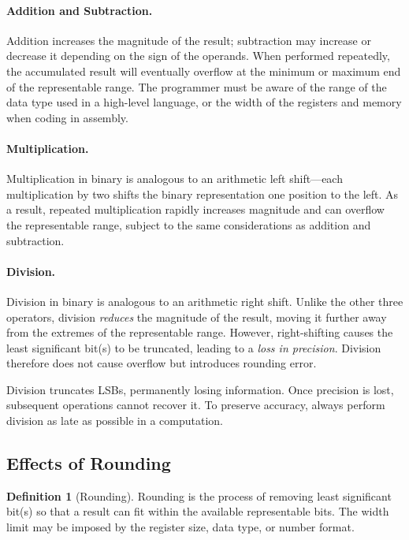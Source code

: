 \documentclass[11pt, a4paper, notitlepage]{report}
\theoremstyle{definition}
\newtheorem{definition}[theorem]{Definition}
\theoremstyle{remark}
\theoremstyle{definition}
\begin{document}
\paragraph{Addition and Subtraction.}
Addition increases the magnitude of the result; subtraction may increase or decrease it depending on the sign of the operands. When performed repeatedly, the accumulated result will eventually overflow at the minimum or maximum end of the representable range. The programmer must be aware of the range of the data type used in a high-level language, or the width of the registers and memory when coding in assembly.

\paragraph{Multiplication.}
Multiplication in binary is analogous to an arithmetic left shift---each multiplication by two shifts the binary representation one position to the left. As a result, repeated multiplication rapidly increases magnitude and can overflow the representable range, subject to the same considerations as addition and subtraction.

\paragraph{Division.}
Division in binary is analogous to an arithmetic right shift. Unlike the other three operators, division \emph{reduces} the magnitude of the result, moving it further away from the extremes of the representable range. However, right-shifting causes the least significant bit(s) to be truncated, leading to a \emph{loss in precision}. Division therefore does not cause overflow but introduces rounding error.

\begin{warning}[title={Warning: Division Destroys Precision}]
  Division truncates LSBs, permanently losing information. Once precision is lost, subsequent operations cannot recover it. To preserve accuracy, always perform division as late as possible in a computation.
\end{warning}

\subsection{Effects of Rounding}
\label{sec:rounding-effects}

\begin{definition}[Rounding]
  \label{def:rounding}
  Rounding is the process of removing least significant bit(s) so that a result can fit within the available representable bits. The width limit may be imposed by the register size, data type, or number format.
\end{definition}
\end{document}
